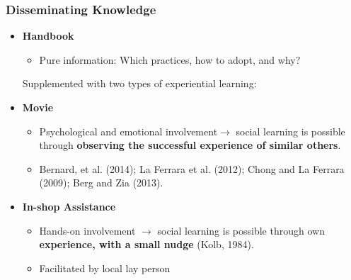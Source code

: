 \documentclass[hideothersubsections, usenames,dvipsnames,10pt]{beamer}
\begin{document}
%
\begin{frame}
\frametitle{Disseminating Knowledge}
		\begin{itemize}
		\item \textbf{Handbook}
			\begin{itemize}
			\item \textcolor[rgb]{0.00,0.07,1.00}{Pure information}: Which practices, how to adopt, and why?\\
			\end{itemize}
\bigskip
Supplemented with two types of experiential learning:
\bigskip
		\item \textbf{Movie}
			\begin{itemize}
			\item \textcolor[rgb]{0.00,0.07,1.00}{Psychological and emotional involvement}$\rightarrow$ social learning is possible through \textbf{observing the successful experience of similar others}.
			\item Bernard, et al. (2014); La Ferrara et al. (2012); Chong and La Ferrara (2009); Berg and Zia (2013).\\
			\end{itemize}

\bigskip
		\item \textbf{In-shop Assistance}
			\begin{itemize}
			\item \textcolor[rgb]{0.00,0.07,1.00}{Hands-on involvement} $\rightarrow$ social learning is possible through own \textbf{experience, with a small nudge} (Kolb, 1984).
			\item Facilitated by local lay person
			\end{itemize}
			\vspace{0.05in}
		\end{itemize}

\end{frame}
\end{document}
